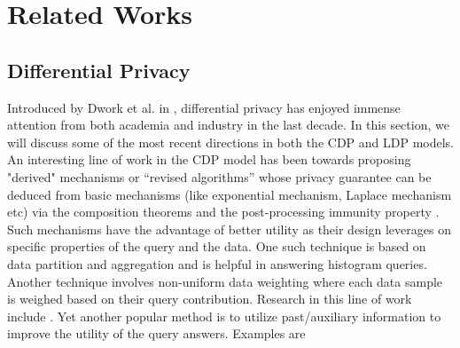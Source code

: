 \section{Related Works}
\subsection{Differential Privacy}
Introduced by Dwork et al. in \cite{Dork}, differential privacy has enjoyed immense attention from both academia and industry in the last decade. In this section, we will discuss some of the most recent directions in both the CDP and LDP models. An interesting line of work in the CDP model has been towards proposing "derived" mechanisms \cite{MVG} or  “revised algorithms” \cite{Blocki} whose privacy guarantee can be deduced from basic mechanisms (like exponential mechanism, Laplace mechanism etc) via the composition theorems and
the post-processing immunity property \cite{Dork}. Such mechanisms have the advantage of better utility as their design leverages on  specific properties of the query and the data.   One such technique is based on data partition and aggregation  \cite{AHP,DAWA,hist1,hist2,hist3,hist4,hist6,hist7,hist8} and is helpful in answering histogram queries. Another technique involves 
non-uniform data weighting where each data sample is weighed based on their query contribution. Research in this line of work include \cite{u1,u2,MWEM}. Yet another popular method is to utilize past/auxiliary information
to improve the utility of the query answers. Examples are \cite{A1,A2,A3,A4,A5,A6,A7,A8}


